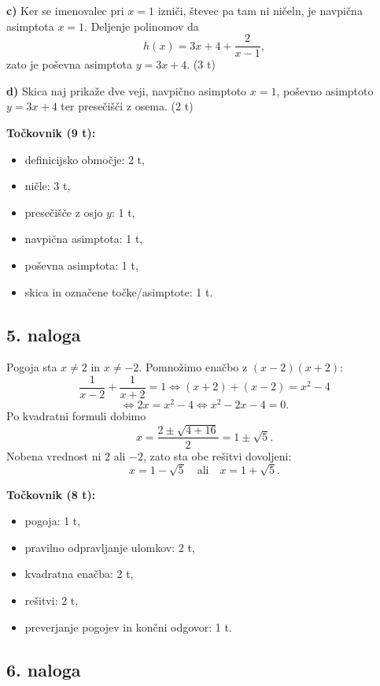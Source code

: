 \documentclass[11pt]{article}
\begin{document}
\textbf{c)} Ker se imenovalec pri $x=1$ izniči, števec pa tam ni ničeln, je navpična asimptota $x=1$. Deljenje polinomov da
\[
 h(x)=3x+4+\frac{2}{x-1},
\]
zato je poševna asimptota $y=3x+4$. (3 t)

\textbf{d)} Skica naj prikaže dve veji, navpično asimptoto $x=1$, poševno asimptoto $y=3x+4$ ter presečišči z osema. (2 t)

\textbf{Točkovnik (9 t):}
\vspace{0.35em}
\begin{itemize}[leftmargin=2.5em]
  \item definicijsko območje: 2 t,
  \item ničle: 3 t,
  \item presečišče z osjo $y$: 1 t,
  \item navpična asimptota: 1 t,
  \item poševna asimptota: 1 t,
  \item skica in označene točke/asimptote: 1 t.
\end{itemize}

\subsection*{5. naloga}
\vspace{0.2em}

Pogoja sta $x\ne 2$ in $x\ne -2$. Pomnožimo enačbo z $(x-2)(x+2)$:
\[
 \frac{1}{x-2}+\frac{1}{x+2}=1
 \iff (x+2)+(x-2)=x^2-4
\]
\[
 \iff 2x=x^2-4
 \iff x^2-2x-4=0.
\]
Po kvadratni formuli dobimo
\[
 x=\frac{2\pm\sqrt{4+16}}{2}=1\pm\sqrt{5}.
\]
Nobena vrednost ni $2$ ali $-2$, zato sta obe rešitvi dovoljeni:
\[
 \boxed{x=1-\sqrt{5}\quad\text{ali}\quad x=1+\sqrt{5}}.
\]

\textbf{Točkovnik (8 t):}
\vspace{0.35em}
\begin{itemize}[leftmargin=2.5em]
  \item pogoja: 1 t,
  \item pravilno odpravljanje ulomkov: 2 t,
  \item kvadratna enačba: 2 t,
  \item rešitvi: 2 t,
  \item preverjanje pogojev in končni odgovor: 1 t.
\end{itemize}

\subsection*{6. naloga}
\vspace{0.2em}
\end{document}
